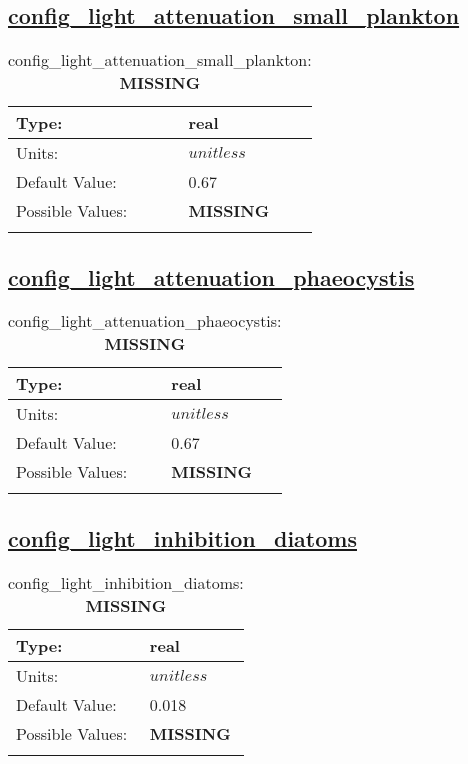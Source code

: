 \subsection[config\_light\_attenuation\_small\_plankton]{\hyperref[sec:nm_tab_biogeochemistry]{config\_light\_attenuation\_small\_plankton}}
\label{subsec:nm_sec_config_light_attenuation_small_plankton}
\begin{center}
\begin{longtable}{| p{2.0in} || p{4.0in} |}
    \hline
    Type: & real \\
    \hline
    Units: & $unitless$ \\
    \hline
    Default Value: & 0.67 \\
    \hline
    Possible Values: & {\bf \color{red} MISSING} \\
    \hline
    \caption{config\_light\_attenuation\_small\_plankton: {\bf \color{red} MISSING}}
\end{longtable}
\end{center}
\subsection[config\_light\_attenuation\_phaeocystis]{\hyperref[sec:nm_tab_biogeochemistry]{config\_light\_attenuation\_phaeocystis}}
\label{subsec:nm_sec_config_light_attenuation_phaeocystis}
\begin{center}
\begin{longtable}{| p{2.0in} || p{4.0in} |}
    \hline
    Type: & real \\
    \hline
    Units: & $unitless$ \\
    \hline
    Default Value: & 0.67 \\
    \hline
    Possible Values: & {\bf \color{red} MISSING} \\
    \hline
    \caption{config\_light\_attenuation\_phaeocystis: {\bf \color{red} MISSING}}
\end{longtable}
\end{center}
\subsection[config\_light\_inhibition\_diatoms]{\hyperref[sec:nm_tab_biogeochemistry]{config\_light\_inhibition\_diatoms}}
\label{subsec:nm_sec_config_light_inhibition_diatoms}
\begin{center}
\begin{longtable}{| p{2.0in} || p{4.0in} |}
    \hline
    Type: & real \\
    \hline
    Units: & $unitless$ \\
    \hline
    Default Value: & 0.018 \\
    \hline
    Possible Values: & {\bf \color{red} MISSING} \\
    \hline
    \caption{config\_light\_inhibition\_diatoms: {\bf \color{red} MISSING}}
\end{longtable}
\end{center}
